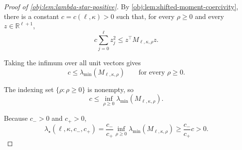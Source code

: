 \begin{proof}[Proof of \cref{obj:lem:lambda-star-positive}]
By \cref{obj:lem:shifted-moment-coercivity}, there is a constant
\(c=c(\ell,\kappa)>0\) such that, for every \(\rho\ge0\) and every
\(z\in\mathbb R^{\ell+1}\),
\[
c\sum_{j=0}^{\ell}z_j^2
\le
z^\top M_{\ell,\kappa,\rho}z .
\] %

Taking the infimum over all unit vectors gives
\[
c\le \lambda_{\min}(M_{\ell,\kappa,\rho})
\qquad\text{for every }\rho\ge0 .
\] %

The indexing set \(\{\rho:\rho\ge0\}\) is nonempty, so
\[
c
\le
\inf_{\rho\ge0}\lambda_{\min}(M_{\ell,\kappa,\rho}).
\] %

Because \(c_->0\) and \(c_+>0\),
\[
\lambda_\star(\ell,\kappa,c_-,c_+)
=
\frac{c_-}{c_+}\inf_{\rho\ge0}
\lambda_{\min}(M_{\ell,\kappa,\rho})
\ge
\frac{c_-}{c_+}c
>
0 .
\] %
\end{proof}
